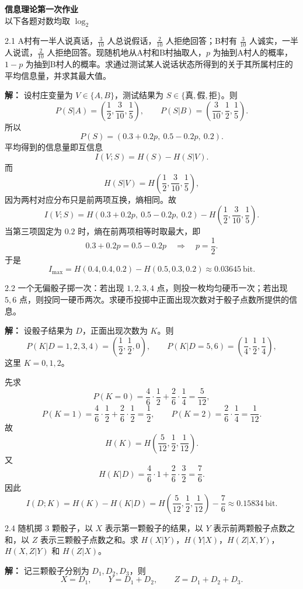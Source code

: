 \documentclass[UTF8,11pt,a4paper]{ctexart}
\begin{document}
\begin{center}
  {\bfseries 信息理论第一次作业}\\[0.4em]
  {\small 以下各题对数均取 $\log_2$}
\end{center}

\vspace{0.8em}

\begin{problem}{2.1}
A村有一半人说真话，$\frac{3}{10}$ 人总说假话，$\frac{2}{10}$ 人拒绝回答；B村有 $\frac{3}{10}$ 人诚实，一半人说谎，$\frac{2}{10}$ 人拒绝回答。现随机地从A村和B村抽取人，$p$ 为抽到A村人的概率，$1-p$ 为抽到B村人的概率。求通过测试某人说话状态所得到的关于其所属村庄的平均信息量，并求其最大值。
\end{problem}
\noindent\textbf{解：}
设村庄变量为 $V\in\{A,B\}$，测试结果为 $S\in\{\text{真},\text{假},\text{拒}\}$。则
\[
P(S|A)=\left(\frac12,\frac{3}{10},\frac15\right),\qquad
P(S|B)=\left(\frac{3}{10},\frac12,\frac15\right).
\]
所以
\[
P(S)=\left(0.3+0.2p,\ 0.5-0.2p,\ 0.2\right).
\]
平均得到的信息量即互信息
\[
I(V;S)=H(S)-H(S|V).
\]
而
\[
H(S|V)=H\!\left(\frac12,\frac{3}{10},\frac15\right),
\]
因为两村对应分布只是前两项互换，熵相同。故
\[
I(V;S)=H(0.3+0.2p,\ 0.5-0.2p,\ 0.2)-H\!\left(\frac12,\frac{3}{10},\frac15\right).
\]
当第三项固定为 $0.2$ 时，熵在前两项相等时取最大，即
\[
0.3+0.2p=0.5-0.2p \quad\Longrightarrow\quad p=\frac12.
\]
于是
\[
I_{\max}=H(0.4,0.4,0.2)-H(0.5,0.3,0.2)\approx 0.03645\ \text{bit}.
\]
\vspace{0.8em}

\begin{problem}{2.2}
一个无偏骰子掷一次：若出现 $1,2,3,4$ 点，则投一枚均匀硬币一次；若出现 $5,6$ 点，则投同一硬币两次。求硬币投掷中正面出现次数对于骰子点数所提供的信息。
\end{problem}
\noindent\textbf{解：}
设骰子结果为 $D$，正面出现次数为 $K$。则
\[
P(K|D=1,2,3,4)=\left(\frac12,\frac12,0\right),
\qquad
P(K|D=5,6)=\left(\frac14,\frac12,\frac14\right),
\]
这里 $K=0,1,2$。

先求
\[
P(K=0)=\frac46\cdot\frac12+\frac26\cdot\frac14=\frac{5}{12},
\]
\[
P(K=1)=\frac46\cdot\frac12+\frac26\cdot\frac12=\frac12,
\qquad
P(K=2)=\frac26\cdot\frac14=\frac{1}{12}.
\]
故
\[
H(K)=H\!\left(\frac{5}{12},\frac12,\frac{1}{12}\right).
\]
又
\[
H(K|D)=\frac46\cdot 1+\frac26\cdot\frac32=\frac76.
\]
因此
\[
I(D;K)=H(K)-H(K|D)
=H\!\left(\frac{5}{12},\frac12,\frac{1}{12}\right)-\frac76
\approx 0.15834\ \text{bit}.
\]
\vspace{0.8em}

\begin{problem}{2.4}
随机掷 $3$ 颗骰子，以 $X$ 表示第一颗骰子的结果，以 $Y$ 表示前两颗骰子点数之和，以 $Z$ 表示三颗骰子点数之和。求 $H(X|Y)$，$H(Y|X)$，$H(Z|X,Y)$，$H(X,Z|Y)$ 和 $H(Z|X)$。
\end{problem}
\noindent\textbf{解：}
记三颗骰子分别为 $D_1,D_2,D_3$，则
\[
X=D_1,\qquad Y=D_1+D_2,\qquad Z=D_1+D_2+D_3.
\]
\end{document}
